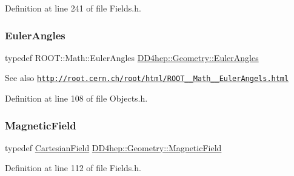 Definition at line 241 of file Fields.\+h.

\hypertarget{namespace_d_d4hep_1_1_geometry_a48c636127488441c543a2c7237cba0d1}{}\label{namespace_d_d4hep_1_1_geometry_a48c636127488441c543a2c7237cba0d1} 
\subsubsection{\texorpdfstring{Euler\+Angles}{EulerAngles}}
{\footnotesize\ttfamily typedef R\+O\+O\+T\+::\+Math\+::\+Euler\+Angles \hyperlink{namespace_d_d4hep_1_1_geometry_a48c636127488441c543a2c7237cba0d1}{D\+D4hep\+::\+Geometry\+::\+Euler\+Angles}}

\begin{DoxySeeAlso}{See also}
\href{http://root.cern.ch/root/html/ROOT__Math__EulerAngels.html}{\tt http\+://root.\+cern.\+ch/root/html/\+R\+O\+O\+T\+\_\+\+\_\+\+Math\+\_\+\+\_\+\+Euler\+Angels.\+html} 
\end{DoxySeeAlso}


Definition at line 108 of file Objects.\+h.

\hypertarget{namespace_d_d4hep_1_1_geometry_a4335218852430195169d47112d47dde6}{}\label{namespace_d_d4hep_1_1_geometry_a4335218852430195169d47112d47dde6} 
\subsubsection{\texorpdfstring{Magnetic\+Field}{MagneticField}}
{\footnotesize\ttfamily typedef \hyperlink{class_d_d4hep_1_1_geometry_1_1_cartesian_field}{Cartesian\+Field} \hyperlink{namespace_d_d4hep_1_1_geometry_a4335218852430195169d47112d47dde6}{D\+D4hep\+::\+Geometry\+::\+Magnetic\+Field}}



Definition at line 112 of file Fields.\+h.

\hypertarget{namespace_d_d4hep_1_1_geometry_a0cddd542681c17a184500750327bcb64}{}\label{namespace_d_d4hep_1_1_geometry_a0cddd542681c17a184500750327bcb64} 
